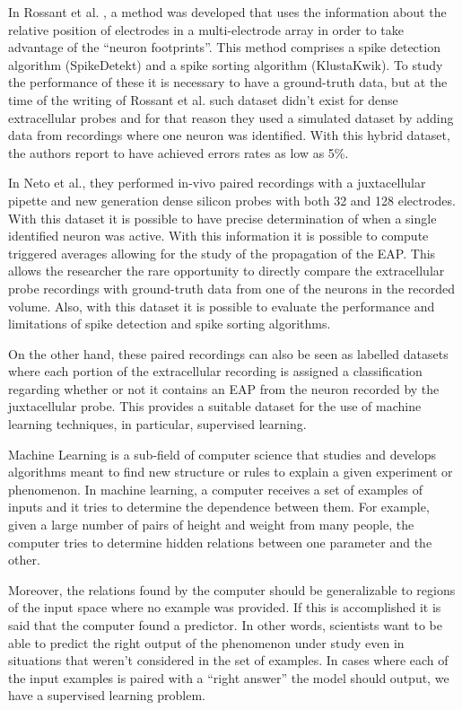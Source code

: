 In Rossant et al. \cite{Rossant2016}, a method was developed that uses the information about the relative position of electrodes in a multi-electrode array in order to take advantage of the “neuron footprints”. This method comprises a spike detection algorithm (SpikeDetekt) and a spike sorting algorithm (KlustaKwik). To study the performance of these it is necessary to have a ground-truth data, but at the time of the writing of Rossant et al. such dataset didn't exist for dense extracellular probes and for that reason they used a simulated dataset by adding data from recordings where one neuron was identified. With this hybrid dataset, the authors report to have achieved errors rates as low as 5\%.

In Neto et al., they performed in-vivo paired recordings with a juxtacellular pipette and new generation dense silicon probes with both 32 and 128 electrodes. With this dataset it is possible to have precise determination of when a single identified neuron was active. With this information it is possible to compute triggered averages allowing for the study of the propagation of the EAP. This allows the researcher the rare opportunity to directly compare the extracellular probe recordings with ground-truth data from one of the neurons in the recorded volume. Also, with this dataset it is possible to evaluate the performance and limitations of spike detection and spike sorting algorithms.

On the other hand, these paired recordings can also be seen as labelled datasets where each portion of the extracellular recording is assigned a classification regarding whether or not it contains an EAP from the neuron recorded by the juxtacellular probe. This provides a suitable dataset for the use of machine learning techniques, in particular, supervised learning.

Machine Learning is a sub-field of computer science that studies and develops algorithms meant to find new structure or rules to explain a given experiment or phenomenon. In machine learning, a computer receives a set of examples of inputs and it tries to determine the dependence between them. For example, given a large number of pairs of height and weight from many people, the computer tries to determine hidden relations between one parameter and the other.
 
Moreover, the relations found by the computer should be generalizable to regions of the input space where no example was provided. If this is accomplished it is said that the computer found a predictor. In other words, scientists want to be able to predict the right output of the phenomenon under study even in situations that weren't considered in the set of examples. 
In cases where each of the input examples is paired with a “right answer” the model should output, we have a supervised learning problem.

